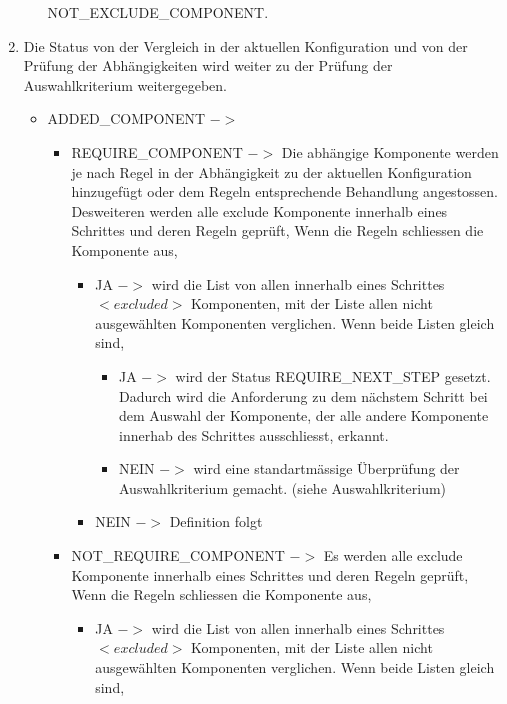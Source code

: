 \documentclass{article}
\begin{document}
\begin{enumerate}
\begin{itemize}
    NOT\_EXCLUDE\_COMPONENT.
  \end{itemize}
  \item Die Status von der Vergleich in der aktuellen Konfiguration und von der
  Pr\"ufung der Abh\"angigkeiten wird weiter zu der Pr\"ufung der
  Auswahlkriterium weitergegeben.
  \begin{itemize}
    \item ADDED\_COMPONENT $->$
    \begin{itemize}
      \item REQUIRE\_COMPONENT $->$ Die abh\"angige Komponente werden je nach
      Regel in der Abh\"angigkeit zu der aktuellen Konfiguration hinzugef\"ugt
      oder dem Regeln entsprechende Behandlung angestossen.\\
      Desweiteren werden
      alle exclude Komponente innerhalb eines Schrittes und deren Regeln
      gepr\"uft, Wenn die Regeln schliessen die Komponente aus,
      \begin{itemize}
        \item JA $->$ wird die List von allen innerhalb eines
        Schrittes $<excluded>$ Komponenten, mit der Liste allen nicht ausgew\"ahlten
        Komponenten verglichen. Wenn beide Listen gleich sind,
        \begin{itemize}
          \item JA $->$ wird der Status REQUIRE\_NEXT\_STEP gesetzt. Dadurch
          wird die Anforderung zu dem n\"achstem Schritt bei dem Auswahl der
          Komponente, der alle andere Komponente innerhab des Schrittes
          ausschliesst, erkannt.
          \item NEIN $->$ wird eine standartmässige \"Uberpr\"ufung der
          Auswahlkriterium gemacht. (siehe Auswahlkriterium)
        \end{itemize}
        \item NEIN $->$ Definition folgt
      \end{itemize}
      \item NOT\_REQUIRE\_COMPONENT $->$ Es werden
      alle exclude Komponente innerhalb eines Schrittes und deren Regeln
      gepr\"uft, Wenn die Regeln schliessen die Komponente aus,
      \begin{itemize}
        \item JA $->$ wird die List von allen innerhalb eines
        Schrittes $<excluded>$ Komponenten, mit der Liste allen nicht ausgew\"ahlten
        Komponenten verglichen. Wenn beide Listen gleich sind,
        \begin{itemize}

\end{itemize}
\end{itemize}
\end{itemize}
\end{itemize}
\end{enumerate}
\end{document}

